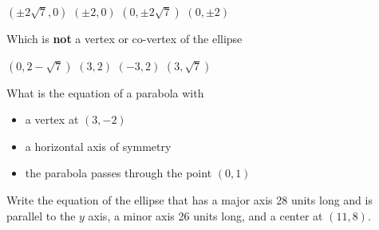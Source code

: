 \documentclass[11pt,answers]{exam}
\begin{document}
\begin{questions}
\begin{minipage}{\linewidth}
\begin{choices}
	\CorrectChoice $(\pm 2\sqrt7,0)$
	\choice $(\pm 2,0)$
	\choice $(0, \pm 2\sqrt7)$
	\choice $(0, \pm 2)$
\end{choices} \answerline
\vspace{0.5in}
\end{minipage}
\begin{minipage}{\linewidth}
\question[3]  Which is \textbf{not} a vertex or co-vertex of the ellipse 

\begin{choices}
	\choice $(0,2-\sqrt{7})$
	\choice $(3,2)$
	\choice $(-3,2)$
	\CorrectChoice $(3,\sqrt{7})$
\end{choices} \answerline
\vspace{0.5in}


\end{minipage}
\begin{minipage}{\linewidth}
\question[3] What is the equation of a parabola with
\begin{itemize}
	\item a vertex
 at $(3, -2)$
 \item a horizontal axis of symmetry
 \item the parabola passes through the point $(0, 1)$
\end{itemize}

 \begin{choices}
\CorrectChoice {}
\choice {}
\choice {}
\choice {}
\choice {}
\end{choices} \answerline
\vspace{0.5in}


\end{minipage}
\begin{minipage}{\linewidth}
\question[3] Write the equation of the ellipse that has a major axis 28 units long and is parallel to the $y$ axis,
 a minor axis 26 units long, and a center at $(11, 8)$.
 \vspace{1ex}


\end{minipage}
\end{questions}
\end{document}
